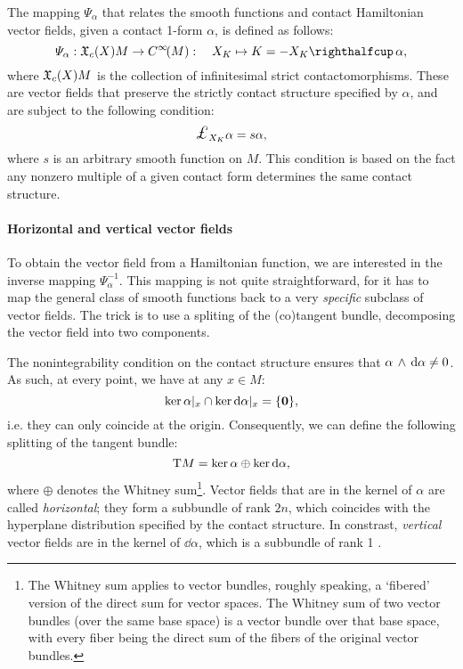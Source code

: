 The mapping $\Psi_\alpha$ that relates the smooth functions and contact Hamiltonian vector fields, given a contact 1-form $\alpha$, is defined as follows:
\begin{equation}
    \Psi_\alpha: \vsfields{c}{X}{M} \to \functions{M}: \quad X_K \mapsto K = -\intpr{X_K}{\alpha}, 
    \label{eq:psi_definition}
\end{equation}
where $\mathfrak{X}_{c}\qty(X){M}$ is the collection of infinitesimal strict contactomorphisms. These are vector fields that preserve the strictly contact structure specified by $\alpha$, and are subject to the following condition:
\begin{equation}
    \lied{X_K}{\alpha} = s \alpha, 
    \label{eq:contact_vf_condition}
\end{equation}
where $s$ is an arbitrary smooth function on $M$. This condition is based on the fact any nonzero multiple of a given contact form determines the same contact structure.

\paragraph{Horizontal and vertical vector fields} To obtain the vector field from a Hamiltonian function, we are interested in the inverse mapping $\Psi^{-1}_\alpha$. This mapping is not quite straightforward, for it has to map the general class of smooth functions back to a very \emph{specific} subclass of vector fields. The trick is to use a spliting of the (co)tangent bundle, decomposing the vector field into two components. 

The nonintegrability condition on the contact structure ensures that $ \alpha\,\wedge\,\dd{\alpha}  \neq 0$. As such, at every point, we have at any $x\in M$:
$$ \ker{\alpha}\vert_x \cap \ker{\dd{\alpha}}\vert_x = \qty{\mathbf{0}}, $$
i.e. they can only coincide at the origin. Consequently, we can define the following splitting of the tangent bundle:
$$ \mathrm{T}M = \ker{\alpha}\oplus\ker{\dd{\alpha}}, $$
where $\oplus$ denotes the Whitney sum\footnote{The Whitney sum applies to vector bundles, roughly speaking, a `fibered' version of the direct sum for vector spaces. The Whitney sum of two vector bundles (over the same base space) is a vector bundle over that base space, with every fiber being the direct sum of the fibers of the original vector bundles.}. Vector fields that are in the kernel of $\alpha$ are called \emph{horizontal}; they form a subbundle of rank $2n$, which coincides with the hyperplane distribution specified by the contact structure. In constrast, \emph{vertical} vector fields are in the kernel of $\dd{\alpha}$, which is a subbundle of rank 1 \cite{Libermann1987}.

